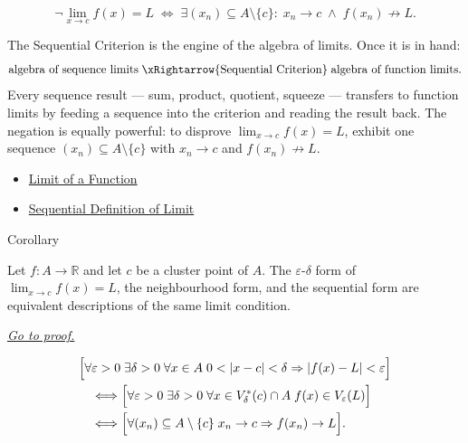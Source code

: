 \begin{remark*}
\[
  \neg\lim_{x\to c}f(x)=L
  \;\iff\;
  \exists (x_n) \subseteq A \setminus \{c\} :\;
  x_n \to c \;\wedge\; f(x_n) \not\to L.
\]
\end{remark*}

\begin{remark*}[Interpretation]
The Sequential Criterion is the engine of the algebra of limits.
Once it is in hand:
\[
  \text{algebra of sequence limits}
  \;\xRightarrow{\text{Sequential Criterion}}\;
  \text{algebra of function limits.}
\]
Every sequence result --- sum, product, quotient, squeeze --- transfers
to function limits by feeding a sequence into the criterion and
reading the result back. The negation is equally powerful: to
disprove $\lim_{x\to c}f(x)=L$, exhibit one sequence
$(x_n) \subseteq A \setminus \{c\}$ with $x_n \to c$ and
$f(x_n) \not\to L$.
\end{remark*}

\begin{dependencies}
\begin{itemize}
  \item \hyperref[def:limit-function]{Limit of a Function}
  \item \hyperref[def:limit-function-sequential]{Sequential Definition of Limit}
\end{itemize}
\end{dependencies}


\begin{corollarybox}{Corollary}
\begin{corollary}
\label{cor:limit-three-equiv}
Let $f : A \to \mathbb{R}$ and let $c$ be a cluster point of $A$.
The $\varepsilon$-$\delta$ form of $\lim_{x\to c}f(x)=L$, the
neighbourhood form, and the sequential form are equivalent descriptions
of the same limit condition.

\smallskip\noindent
\hyperref[prf:limit-three-equiv]{\textit{Go to proof.}}
\end{corollary}
\end{corollarybox}

\begin{remark*}
\[
\begin{aligned}
&\Bigl[\forall\varepsilon>0\;\exists\delta>0\;\forall x\in A\;
  0<|x-c|<\delta\Rightarrow |f(x)-L|<\varepsilon\Bigr] \\
&\quad\Longleftrightarrow
\Bigl[\forall\varepsilon>0\;\exists\delta>0\;\forall x\in V_\delta^*(c)\cap A\;
  f(x)\in V_\varepsilon(L)\Bigr] \\
&\quad\Longleftrightarrow
\Bigl[\forall (x_n)\subseteq A\setminus\{c\}\;
  x_n\to c\Rightarrow f(x_n)\to L\Bigr].
\end{aligned}
\]
\end{remark*}

